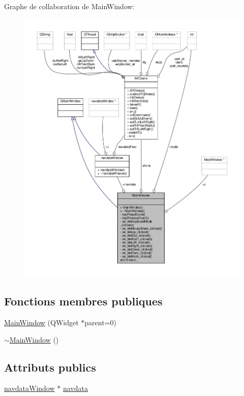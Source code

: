 Graphe de collaboration de Main\-Window\-:
\nopagebreak
\begin{figure}[H]
\begin{center}
\leavevmode
\includegraphics[width=350pt]{class_main_window__coll__graph}
\end{center}
\end{figure}
\subsection*{Fonctions membres publiques}
\begin{DoxyCompactItemize}
\item 
\hyperlink{class_main_window_a8b244be8b7b7db1b08de2a2acb9409db}{Main\-Window} (Q\-Widget $\ast$parent=0)
\item 
\hyperlink{class_main_window_ae98d00a93bc118200eeef9f9bba1dba7}{$\sim$\-Main\-Window} ()
\end{DoxyCompactItemize}
\subsection*{Attributs publics}
\begin{DoxyCompactItemize}
\item 
\hyperlink{classnavdata_window}{navdata\-Window} $\ast$ \hyperlink{class_main_window_a5d39718511ba08b6c71faec434aa836d}{navdata}
\end{DoxyCompactItemize}
